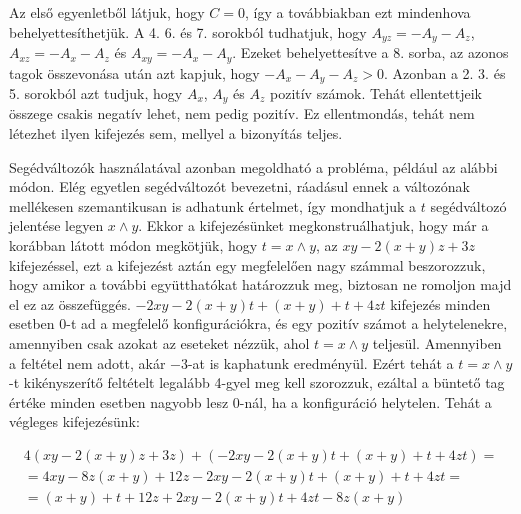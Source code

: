 Az első egyenletből látjuk, hogy $C=0$, így a továbbiakban ezt mindenhova behelyettesíthetjük. A 4. 6. és 7. sorokból tudhatjuk, hogy $A_{yz}=-A_y-A_z$, $A_{xz}=-A_x-A_z$ és $A_{xy}=-A_x-A_y$. Ezeket behelyettesítve a 8. sorba, az azonos tagok összevonása után azt kapjuk, hogy $-A_x-A_y-A_z>0$.
Azonban a 2. 3. és 5. sorokból azt tudjuk, hogy $A_x$, $A_y$ és $A_z$ pozitív számok. Tehát ellentettjeik összege csakis negatív lehet, nem pedig pozitív. Ez ellentmondás, tehát nem létezhet ilyen kifejezés sem, mellyel a bizonyítás teljes.

Segédváltozók használatával azonban megoldható a probléma, például az alábbi módon. Elég egyetlen segédváltozót bevezetni, ráadásul ennek a változónak mellékesen szemantikusan is adhatunk értelmet, így mondhatjuk a $t$ segédváltozó jelentése legyen $x \wedge y$.
Ekkor a kifejezésünket megkonstruálhatjuk, hogy már a korábban látott módon megkötjük, hogy $t = x \wedge y$, az $xy-2(x+y)z+3z$ kifejezéssel, ezt a kifejezést aztán egy megfelelően nagy számmal beszorozzuk, hogy amikor a további együtthatókat határozzuk meg, biztosan ne romoljon majd el ez az összefüggés. $-2xy-2(x+y)t+(x+y)+t+4zt$ kifejezés minden esetben $0$-t ad a megfelelő konfigurációkra, és egy pozitív számot a helytelenekre, amennyiben csak azokat az eseteket nézzük, ahol $t = x \wedge  y$ teljesül. Amennyiben a feltétel nem adott, akár $-3$-at is kaphatunk eredményül. Ezért tehát a $t = x \wedge  y$-t kikényszerítő feltételt legalább 4-gyel meg kell szorozzuk, ezáltal a büntető tag értéke minden esetben nagyobb lesz $0$-nál, ha a konfiguráció helytelen. Tehát a végleges kifejezésünk:



\begin{align}
	4(xy-2(x+y)z+3z)+(-2xy-2(x+y)t+(x+y)+t+4zt) = \\
    = 4xy-8z(x+y)+12z-2xy-2(x+y)t+(x+y)+t+4zt = \\
	= (x+y)+t+12z+2xy-2(x+y)t+4zt-8z(x+y)
\end{align}

